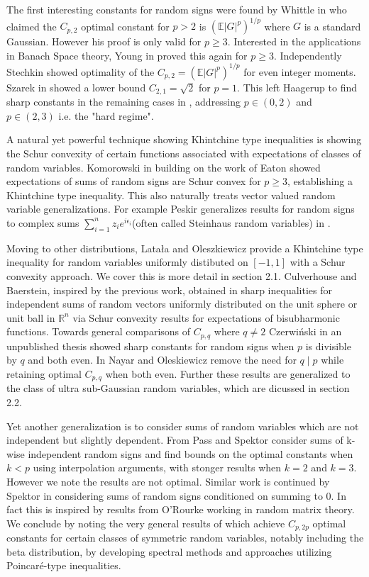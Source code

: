 \documentclass[10pt]{article}
\newcommand{\E}{\mathbb{E}}
\newcommand{\1}{\textbf{1}}
\newcommand{\R}{\mathbb{R}}
\newcommand{\normOne}[1]{\left\lvert#1\right\rvert}
\newcommand{\lparen}{\left(}
\newcommand{\rparen}{\right)}
\theoremstyle{remark}
\theoremstyle{definition}
\begin{document}
The first interesting constants for random signs were found by Whittle in \cite{W} who claimed the $C_{p,2}$ optimal constant for $p > 2$ is $\lparen\E\normOne{G}^p\rparen^{1/p}$ where $G$ is a standard Gaussian. However his proof is only valid for $p \geq 3$. Interested in the applications in Banach Space theory, Young in \cite{Y} proved this again for $p \geq 3$. Independently Stechkin \cite{SBS} showed optimality of the $C_{p,2} = \lparen \E\normOne{G}^p\rparen^{1/p}$ for even integer moments. Szarek in \cite{S} showed a lower bound $C_{2,1} = \sqrt{2}$ for $p=1$. This left Haagerup to find sharp constants in the remaining cases in \cite{H}, addressing $p \in (0,2)$ and $p\in (2,3)$ i.e. the "hard regime". 

A natural yet powerful technique showing Khintchine type inequalities is showing the Schur convexity of certain functions associated with expectations of classes of random variables. Komorowski in \cite{K} building on the work of Eaton \cite{E} showed expectations of sums of random signs are Schur convex for $p\geq 3$, establishing a Khintchine type inequality. This also naturally treats vector valued random variable generalizations. For example Peskir generalizes results for random signs to complex sums $\sum_{i=1}^n z_ie^{i\epsilon_i}$(often called Steinhaus random variables) in \cite{P}. 

Moving to other distributions, Lata\l a and Oleszkiewicz provide a Khintchine type inequality for random variables uniformly distibuted on $[-1,1]$ with a Schur convexity approach. We cover this is more detail in section 2.1. Culverhouse and Baerstein, inspired by the previous work, obtained in \cite{BC} sharp inequalities for independent sums of random vectors uniformly distributed on the unit sphere or unit ball in $\R^n$ via Schur convexity results for expectations of bisubharmonic functions. Towards general comparisons of $C_{p,q}$ where $q \neq 2$ Czerwi\'nski in an unpublished thesis showed sharp constants for random signs when $p$ is divisible by $q$ and both even. In \cite{NO} Nayar and Oleskiewicz remove the need for $q \mid p$ while retaining optimal $C_{p,q}$ when both even. Further these results are generalized to the class of ultra sub-Gaussian random variables, which are dicussed in section 2.2.

Yet another generalization is to consider sums of random variables which are not independent but slightly dependent. From \cite{SP} Pass and Spektor consider sums of k-wise independent random signs and find bounds on the optimal constants when $k < p$ using interpolation arguments, with stonger results when $k=2$ and $k=3$. However we note the results are not optimal. Similar work is continued by Spektor in \cite{SS} considering sums of random signs conditioned on summing to 0. In fact this is inspired by results from O'Rourke \cite{SOR} working in random matrix theory. We conclude by noting the very general results of \cite{KLO} which achieve $C_{p,2p}$ optimal constants for certain classes of symmetric random variables, notably including the beta distribution, by developing spectral methods and approaches utilizing Poincar\'e-type inequalities.
\end{document}
